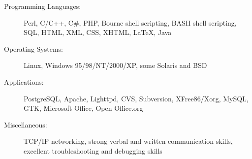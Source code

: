 \documentclass{resume}
\begin{document}
\begin{description}
\item[Programming Languages:]
Perl, C/C++, C\#, PHP, Bourne shell scripting, BASH shell scripting, SQL, HTML, XML, CSS, XHTML, \LaTeX, Java
\item[Operating Systems:]
Linux, Windows 95/98/NT/2000/XP, some Solaris and BSD
\item[Applications:]
PostgreSQL, Apache, Lighttpd, CVS, Subversion, XFree86/Xorg, MySQL, GTK, Microsoft Office, Open Office.org
\item[Miscellaneous:]
TCP/IP networking, strong verbal and written communication skills, excellent troubleshooting and debugging skills
\end{description}
\end{document}
